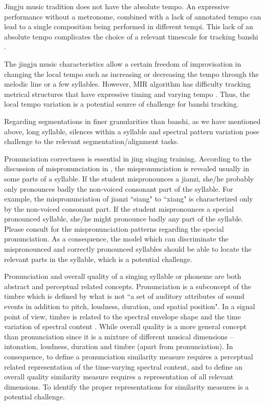 Jingju music tradition does not have the absolute tempo. An expressive performance without a metronome, combined with a lack of annotated tempo can lead to a single composition being performed in different tempi. This lack of an absolute tempo complicates the choice of a relevant timescale for tracking \gls{banshi} \cite{Srinivasamurthy2016}.

The jingju music characteristics allow a certain freedom of improvisation in changing the local tempo such as increasing or decreasing the tempo through the melodic line or a few syllables. However, \gls{MIR} algorithm has difficulty tracking metrical structures that have expressive timing and varying tempo \cite{Holzapfel2012a}. Thus, the local tempo variation is a potential source of challenge for \gls{banshi} tracking.

Regarding segmentations in finer granularities than \gls{banshi}, as we have mentioned above, long syllable, silences within a syllable and spectral pattern variation pose challenge to the relevant segmentation/alignment tasks. 

Pronunciation correctness is essential in jing singing training. According to the discussion of mispronunciation in , the mispronunciation is revealed usually in some parts of a syllable. If the student mispronounces a \gls{jianzi}, she/he probably only pronounces badly the non-voiced consonant part of the syllable. For example, the mispronunciation of \gls{jianzi} ``siang" to ``xiang" is characterized only by the non-voiced consonant part. If the student mispronounces a special pronounced syllable, she/he might pronounce badly any part of the syllable. Please consult  for the mispronunciation patterns regarding the special pronunciation. As a consequence, the model which can discriminate the mispronounced and correctly pronounced syllables should be able to locate the relevant parts in the syllable, which is a potential challenge.

Pronunciation and overall quality of a singing syllable or phoneme are both abstract and perceptual related concepts. Pronunciation is a subconcept of the timbre which is defined by what is not ``a set of auditory attributes of sound events in addition to pitch, loudness, duration, and spatial position". In a signal point of view, timbre is related to the spectral envelope shape and the time variation of spectral content \cite{Pons2017Timbre}. While overall quality is a more general concept than pronunciation since it is a mixture of different musical dimensions -- intonation, loudness, duration and timbre (apart from pronunciation). In consequence, to define a pronunciation similarity measure requires a perceptual related representation of the time-varying spectral content, and to define an overall quality similarity measure requires a representation of all relevant dimensions. To identify the proper representations for similarity measures is a potential challenge.

